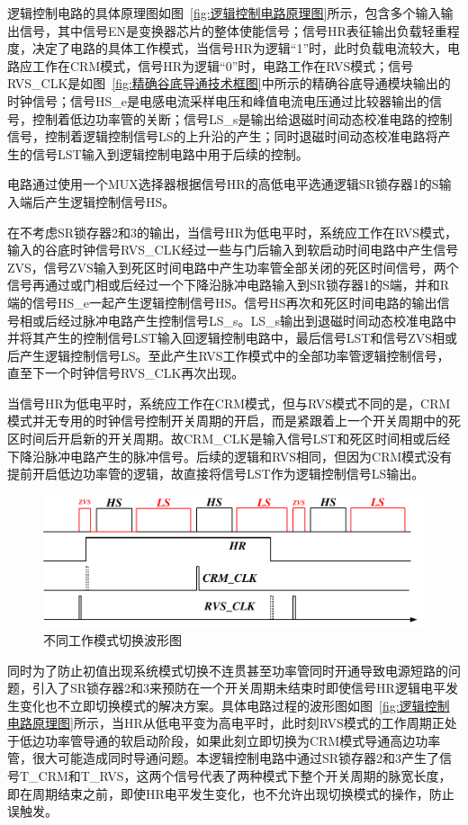 逻辑控制电路的具体原理图如图~\ref{fig:逻辑控制电路原理图}所示，包含多个输入输出信号，其中信号EN是变换器芯片的整体使能信号；信号HR表征输出负载轻重程度，决定了电路的具体工作模式，当信号HR为逻辑“1”时，此时负载电流较大，电路应工作在CRM模式，信号HR为逻辑“0”时，电路工作在RVS模式；信号RVS\_CLK是如图~\ref{fig:精确谷底导通技术框图}中所示的精确谷底导通模块输出的时钟信号；信号HS\_e是电感电流采样电压和峰值电流电压通过比较器输出的信号，控制着低边功率管的关断；信号LS\_s是输出给退磁时间动态校准电路的控制信号，控制着逻辑控制信号LS的上升沿的产生；同时退磁时间动态校准电路将产生的信号LST输入到逻辑控制电路中用于后续的控制。

电路通过使用一个MUX选择器根据信号HR的高低电平选通逻辑SR锁存器1的S输入端后产生逻辑控制信号HS。

在不考虑SR锁存器2和3的输出，当信号HR为低电平时，系统应工作在RVS模式，输入的谷底时钟信号RVS\_CLK经过一些与门后输入到软启动时间电路中产生信号ZVS，信号ZVS输入到死区时间电路中产生功率管全部关闭的死区时间信号，两个信号再通过或门相或后经过一个下降沿脉冲电路输入到SR锁存器1的S端，并和R端的信号HS\_e一起产生逻辑控制信号HS。信号HS再次和死区时间电路的输出信号相或后经过脉冲电路产生控制信号LS\_s。LS\_s输出到退磁时间动态校准电路中并将其产生的控制信号LST输入回逻辑控制电路中，最后信号LST和信号ZVS相或后产生逻辑控制信号LS。至此产生RVS工作模式中的全部功率管逻辑控制信号，直至下一个时钟信号RVS\_CLK再次出现。

当信号HR为低电平时，系统应工作在CRM模式，但与RVS模式不同的是，CRM模式并无专用的时钟信号控制开关周期的开启，而是紧跟着上一个开关周期中的死区时间后开启新的开关周期。故CRM\_CLK是输入信号LST和死区时间相或后经下降沿脉冲电路产生的脉冲信号。后续的逻辑和RVS相同，但因为CRM模式没有提前开启低边功率管的逻辑，故直接将信号LST作为逻辑控制信号LS输出。

\begin{figure}[htbp] 
    \centering
    \includegraphics[width=0.8\linewidth]{figures/逻辑控制波形1.pdf}
    \caption{不同工作模式切换波形图}
    \label{fig:逻辑控制波形1}
\end{figure} 

同时为了防止初值出现系统模式切换不连贯甚至功率管同时开通导致电源短路的问题，引入了SR锁存器2和3来预防在一个开关周期未结束时即使信号HR逻辑电平发生变化也不立即切换模式的解决方案。具体电路过程的波形图如图~\ref{fig:逻辑控制电路原理图}所示，当HR从低电平变为高电平时，此时刻RVS模式的工作周期正处于低边功率管导通的软启动阶段，如果此刻立即切换为CRM模式导通高边功率管，很大可能造成同时导通问题。本逻辑控制电路中通过SR锁存器2和3产生了信号T\_CRM和T\_RVS，这两个信号代表了两种模式下整个开关周期的脉宽长度，即在周期结束之前，即使HR电平发生变化，也不允许出现切换模式的操作，防止误触发。

